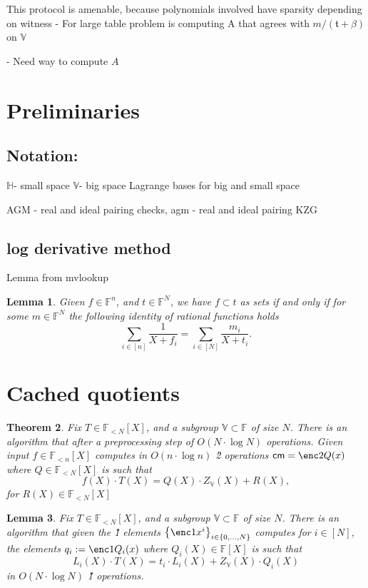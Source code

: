 \documentclass[11pt]{article} %
\newcommand{\F}{\ensuremath{\mathbb F}\xspace}
\newcommand{\cm}{\ensuremath{\mathsf{cm}}\xspace}
\newcommand{\defeq}{:=}
\newcommand{\sett}[2]{\ensuremath{\set{#1}_{#2}}\xspace}
\newcommand{\set}[1]{\ensuremath{\left\{#1\right\}}\xspace}
\newcommand{\polysofdeg}[1]{\ensuremath{\F_{< #1}[X]}\xspace}
\newcommand{\sumi}[1]{\sum_{i\in[#1]}}
\newtheorem{lemma}{Lemma}[section]
\newtheorem{thm}[lemma]{Theorem}
\newcommand{\subspace}{\ensuremath{\mathbb{H}}\xspace}
\newcommand{\bigspace}{\ensuremath{\mathbb{V}}\xspace}
\newcommand{\witsize}{\ensuremath{n}\xspace}
\newcommand{\tabsize}{\ensuremath{N}\xspace}
\newcommand{\tab}{\ensuremath{\mathfrak{t}}\xspace}
\begin{document}
This protocol is amenable, because polynomials involved have sparsity depending on witness
- For large table problem is computing A that agrees with $m/(\tab+\beta)$ on \bigspace

- Need way to compute $A$ 
\section{Preliminaries}

\subsection{Notation:}
\subspace - small space
\bigspace - big space
Lagrange bases for big and small space




AGM - real and ideal pairing checks,
agm - real and ideal pairing 
KZG

\subsection{log derivative method}
Lemma from mvlookup
\begin{lemma}\label{lem:mvlookup}
 Given $f\in \F^\witsize$, and $t\in \F^\tabsize$,
 we have $f\subset t$ as sets if and only if for some $m\in \F^\tabsize$ the following identity of rational functions holds
 \[\sumi{\witsize}\frac{1}{X+f_i}=\sumi{\tabsize}\frac{m_i}{X+t_i}.\]
\end{lemma}

\section{Cached quotients}

\begin{thm}
Fix $T\in \polysofdeg{\tabsize}$, and a subgroup $\bigspace\subset \F$ of size \tabsize. 
There is an algorithm that after a preprocessing step of $O(\tabsize\cdot \log \tabsize)$ operations.
Given input $f\in \polysofdeg{\witsize}$ computes in $O(\witsize\cdot \log \witsize)$ \G2 operations
$\cm=\enc2{Q(x)}$ where $Q\in \polysofdeg{\tabsize}$ is such that
\[f(X)\cdot T(X) = Q(X)\cdot Z_{\bigspace}(X) + R(X),\]
for $R(X)\in \polysofdeg{\tabsize}$
\end{thm}


\begin{lemma}
Fix $T\in \polysofdeg{\tabsize}$, and a subgroup $\bigspace\subset \F$ of size \tabsize. 
There is an algorithm that given the \G1 elements $\sett{\enc1{x^i}}{i\in \set{0,\ldots,\tabsize}}$ computes for $i\in [\tabsize]$, the elements 
$q_i\defeq \enc1{Q_i(x)}$
where $Q_i(X)\in \F[X]$ is such that
\[L_i(X)\cdot T(X)=t_i\cdot L_i(X) + Z_\bigspace(X)\cdot Q_i(X)\]
in $O(\tabsize\cdot \log \tabsize)$ \G1 operations.
 
\end{lemma}
\end{document}
